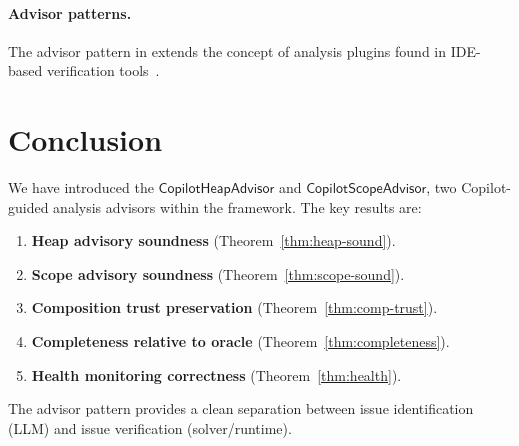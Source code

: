 \documentclass[11pt]{article}
\newcommand{\HeapAdv}{\mathsf{CopilotHeapAdvisor}}
\newcommand{\ScopeAdv}{\mathsf{CopilotScopeAdvisor}}
\begin{document}
\paragraph{Advisor patterns.}
The advisor pattern in \JuGeo{} extends the concept of analysis
plugins found in IDE-based verification tools~\cite{leino2010dafny}.

\section{Conclusion}
\label{sec:conclusion}

We have introduced the $\HeapAdv$ and $\ScopeAdv$, two
Copilot-guided analysis advisors within the \JuGeo{} framework.
The key results are:

\begin{enumerate}
\item \textbf{Heap advisory soundness} (Theorem~\ref{thm:heap-sound}).
\item \textbf{Scope advisory soundness} (Theorem~\ref{thm:scope-sound}).
\item \textbf{Composition trust preservation}
  (Theorem~\ref{thm:comp-trust}).
\item \textbf{Completeness relative to oracle}
  (Theorem~\ref{thm:completeness}).
\item \textbf{Health monitoring correctness}
  (Theorem~\ref{thm:health}).
\end{enumerate}

The advisor pattern provides a clean separation between issue
identification (LLM) and issue verification (solver/runtime).
\end{document}
